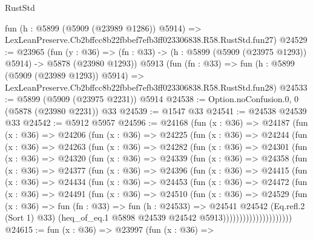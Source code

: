 \begin{lexlean}{RustStd}
\begin{coremodule}
{{    fun (h : @5899 (@5909 (@23989 @1286)) @5914) =>
    LexLeanPreserve.Cb2bffcc8b22fbbef7efb3ff023306838.R58.RustStd.fun27)
@24529 := @23965
    (fun (y : @36) =>
    (fn : @33) -> (h : @5899 (@5909 (@23975 @1293)) @5914) -> @5878 (@23980 @1293))
    @5913
    (fun (fn : @33) =>
    fun (h : @5899 (@5909 (@23989 @1293)) @5914) =>
    LexLeanPreserve.Cb2bffcc8b22fbbef7efb3ff023306838.R58.RustStd.fun28)
@24533 := @5899 (@5909 (@23975 @2231)) @5914
@24538 := Option.noConfusion.{0, 0} (@5878 (@23980 @2231)) @33
@24539 := @1547 @33
@24541 := @24538 @24539 @33
@24542 := @5912 @5957
@24596 := @24168
    (fun (x : @36) =>
    @24187
      (fun (x : @36) =>
      @24206
        (fun (x : @36) =>
        @24225
          (fun (x : @36) =>
          @24244
            (fun (x : @36) =>
            @24263
              (fun (x : @36) =>
              @24282
                (fun (x : @36) =>
                @24301
                  (fun (x : @36) =>
                  @24320
                    (fun (x : @36) =>
                    @24339
                      (fun (x : @36) =>
                      @24358
                        (fun (x : @36) =>
                        @24377
                          (fun (x : @36) =>
                          @24396
                            (fun (x : @36) =>
                            @24415
                              (fun (x : @36) =>
                              @24434
                                (fun (x : @36) =>
                                @24453
                                  (fun (x : @36) =>
                                  @24472
                                    (fun (x : @36) =>
                                    @24491
                                      (fun (x : @36) =>
                                      @24510
                                        (fun (x : @36) =>
                                        @24529
                                          (fun (x : @36) =>
                                          fun (fn : @33) =>
                                          fun (h : @24533) =>
                                          @24541
                                            @24542
                                            (Eq.refl.{2} (Sort 1) @33)
                                            (heq_of_eq.{1}
                                              @5898
                                              @24539
                                              @24542
                                              @5913)))))))))))))))))))))
@24615 := fun (x : @36) =>
  @23997
    (fun (x : @36) =>
}}
\end{coremodule}
\end{lexlean}
